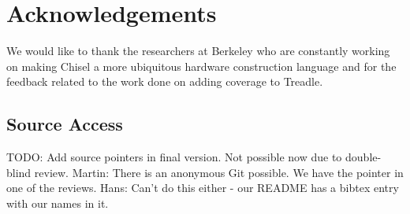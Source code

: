 \documentclass[conference]{IEEEtran}
\newcommand{\todo}[1]{{\color{olive} TODO: #1}}
\newcommand{\martin}[1]{{\color{blue} Martin: #1}}
\newcommand{\hjd}[1]{{\color{pink} Hans: #1}}
\begin{document}
\section*{Acknowledgements}
We would like to thank the researchers at Berkeley who are constantly working on making Chisel a more ubiquitous hardware construction language and for the feedback related to the work done on adding coverage to Treadle.

\subsection*{Source Access}

\todo{Add source pointers in final version. Not possible now due to double-blind review.}
\martin{There is an anonymous Git  possible. We have the pointer in one of the reviews.} \hjd{Can't do this either - our README has a bibtex entry with our names in it.}



\end{document}
